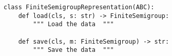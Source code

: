 \begin{verbatim}
class FiniteSemigroupRepresentation(ABC):
    def load(cls, s: str) -> FiniteSemigroup:
        """ Load the data  """

    def save(cls, m: FiniteSemigroup) -> str:
        """ Save the data  """
\end{verbatim}